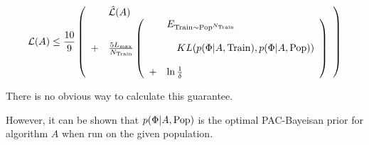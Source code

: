 {
\vfill
$${\cal L}(A) \leq \frac{10}{9}\left(
\begin{array}{ll} & \hat{\cal L}(A) \\
                  + & \frac{5L_{\max}}{N_\mathrm{Train}}\left(\begin{array}{ll} & E_{\mathrm{Train} \sim \mathrm{Pop}^{N_{\mathrm{Train}}}} \\
                                                                                \\                                                           
                                                                              & ~~~KL(p(\Phi|A,\mathrm{Train}),p(\Phi|A,\mathrm{Pop})) \\
                                                                                \\
                                                                             + & \ln\frac{1}{\delta}\end{array}\right)
 \end{array}\right)$$

\vfill
There is no obvious way to calculate this guarantee.

\vfill
However, it can be shown that $p(\Phi|A,\mathrm{Pop})$ is the optimal PAC-Bayeisan prior for algorithm $A$ when run on the given population.


}


